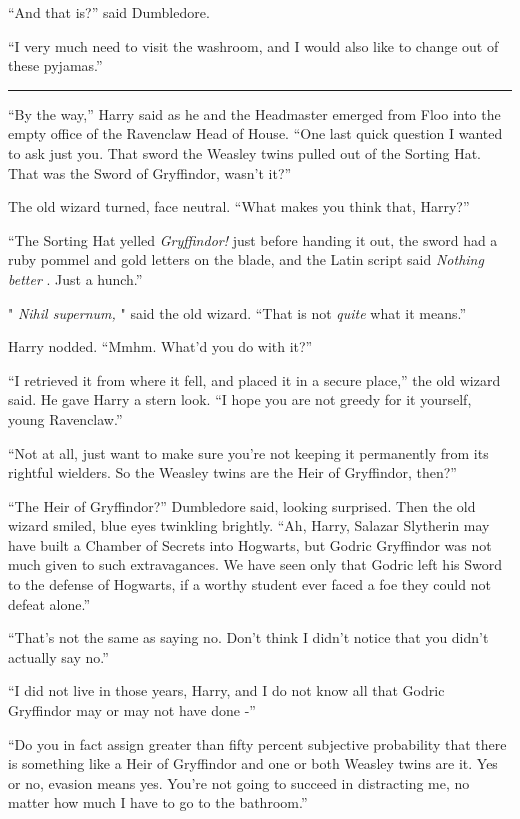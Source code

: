 ``And that is?'' said Dumbledore.

``I very much need to visit the washroom, and I would also like to
change out of these pyjamas.''

\begin{center}\rule{3in}{0.4pt}\end{center}

``By the way,'' Harry said as he and the Headmaster emerged from Floo
into the empty office of the Ravenclaw Head of House. ``One last quick
question I wanted to ask just you. That sword the Weasley twins pulled
out of the Sorting Hat. That was the Sword of Gryffindor, wasn't it?''

The old wizard turned, face neutral. ``What makes you think that,
Harry?''

``The Sorting Hat yelled \emph{Gryffindor!} just before handing it out,
the sword had a ruby pommel and gold letters on the blade, and the Latin
script said \emph{Nothing better} . Just a hunch.''

" \emph{Nihil supernum,} " said the old wizard. ``That is not
\emph{quite} what it means.''

Harry nodded. ``Mmhm. What'd you do with it?''

``I retrieved it from where it fell, and placed it in a secure place,''
the old wizard said. He gave Harry a stern look. ``I hope you are not
greedy for it yourself, young Ravenclaw.''

``Not at all, just want to make sure you're not keeping it permanently
from its rightful wielders. So the Weasley twins are the Heir of
Gryffindor, then?''

``The Heir of Gryffindor?'' Dumbledore said, looking surprised. Then the
old wizard smiled, blue eyes twinkling brightly. ``Ah, Harry, Salazar
Slytherin may have built a Chamber of Secrets into Hogwarts, but Godric
Gryffindor was not much given to such extravagances. We have seen only
that Godric left his Sword to the defense of Hogwarts, if a worthy
student ever faced a foe they could not defeat alone.''

``That's not the same as saying no. Don't think I didn't notice that you
didn't actually say no.''

``I did not live in those years, Harry, and I do not know all that
Godric Gryffindor may or may not have done -''

``Do you in fact assign greater than fifty percent subjective
probability that there is something like a Heir of Gryffindor and one or
both Weasley twins are it. Yes or no, evasion means yes. You're not
going to succeed in distracting me, no matter how much I have to go to
the bathroom.''

